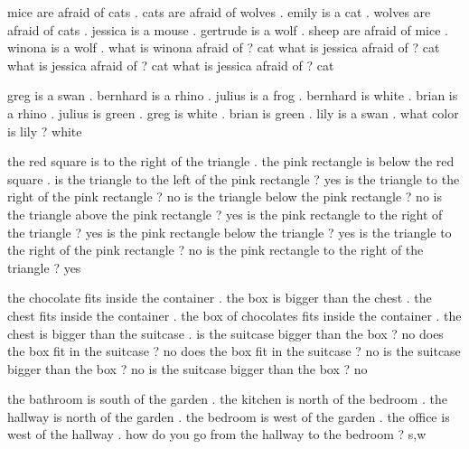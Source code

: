 \begin{tcbraster}[raster columns=2,  size=minimal, raster valign=top]
    \begin{tcolorbox}[mybox, title=Task 15:Name, height fill] 
    \tiny
mice are afraid of cats . cats are afraid of wolves . emily is a cat . wolves are afraid of cats . jessica is a mouse . gertrude is a wolf . sheep are afraid of mice . winona is a wolf . what is winona afraid of ? cat what is jessica afraid of ? cat what is jessica afraid of ? cat what is jessica afraid of ? cat
    \end{tcolorbox}  


    \begin{tcolorbox}[mybox, title=Task 16:Name, height fill] 
    \tiny
 greg is a swan . bernhard is a rhino . julius is a frog . bernhard is white . brian is a rhino . julius is green . greg is white . brian is green . lily is a swan . what color is lily ? white
    \end{tcolorbox}    




    \begin{tcolorbox}[mybox, title=Task 17:Name, height fill] 
    \tiny
 the red square is to the right of the triangle . the pink rectangle is below the red square . is the triangle to the left of the pink rectangle ? yes is the triangle to the right of the pink rectangle ? no is the triangle below the pink rectangle ? no is the triangle above the pink rectangle ? yes is the pink rectangle to the right of the triangle ? yes is the pink rectangle below the triangle ? yes is the triangle to the right of the pink rectangle ? no is the pink rectangle to the right of the triangle ? yes
    \end{tcolorbox}  



    \begin{tcolorbox}[mybox, title=Task 18:Name, height fill] 
    \tiny
the chocolate fits inside the container . the box is bigger than the chest . the chest fits inside the container . the box of chocolates fits inside the container . the chest is bigger than the suitcase . is the suitcase bigger than the box ? no does the box fit in the suitcase ? no does the box fit in the suitcase ? no is the suitcase bigger than the box ? no is the suitcase bigger than the box ? no
    \end{tcolorbox}    



    \begin{tcolorbox}[mybox, title=Task 19:Name, height fill] 
    \tiny
the bathroom is south of the garden . the kitchen is north of the bedroom . the hallway is north of the garden . the bedroom is west of the garden . the office is west of the hallway . how do you go from the hallway to the bedroom ? s,w
    \end{tcolorbox}  



\end{tcbraster}
